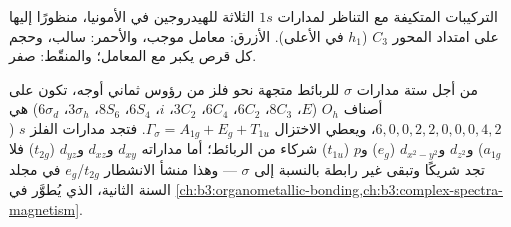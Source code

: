 \begin{omfigure}

{\small التركيبات المتكيفة مع التناظر لمدارات $1s$ الثلاثة للهيدروجين
في الأمونيا، منظورًا إليها على امتداد المحور $C_3$ ($h_1$ في الأعلى). الأزرق: معامل
موجب، والأحمر: سالب، وحجم كل قرص يكبر مع
المعامل؛ والمنقّط: صفر.}
\end{omfigure}

\begin{example}\label{ex:b3:group-theory-applied:ml6}
من أجل ستة مدارات $\sigma$ للربائط متجهة نحو فلز من رؤوس
ثماني أوجه، تكون  على أصناف $O_h$ ($E$، $8C_3$، $6C_2$، $6C_4$،
$3C_2$، $i$، $6S_4$، $8S_6$، $3\sigma_h$، $6\sigma_d$) هي $6, 0, 0, 2, 2, 0, 0, 0, 4,
2$، ويعطي الاختزال $\Gamma_\sigma = A_{1g} + E_g + T_{1u}$. فتجد مدارات الفلز $s$
($a_{1g}$) و$d_{z^2}$ و$d_{x^2-y^2}$ ($e_g$) و$p$ ($t_{1u}$) شركاء من الربائط؛
أما مداراته $d_{xy}$ و$d_{xz}$ و$d_{yz}$ ($t_{2g}$) فلا تجد شريكًا وتبقى غير رابطة
بالنسبة إلى $\sigma$ --- وهذا منشأ الانشطار $t_{2g}$/$e_g$ في مجلد السنة الثانية،
الذي يُطوَّر في \cref{ch:b3:organometallic-bonding,ch:b3:complex-spectra-magnetism}.
\end{example}

